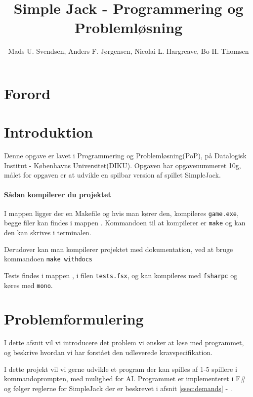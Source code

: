 \documentclass[a4paper]{article}
\title{Simple Jack - Programmering og Problemløsning}
\author{Mads U. Svendsen, Anders F. Jørgensen, Nicolai L. Hargreave, Bo H. Thomsen}
\begin{document}
	\maketitle %
        
  \tableofcontents

  \newpage

\section{Forord}
    
\section{Introduktion} \label{sec:introduction}
    Denne opgave er lavet i Programmering og Problemløsning(PoP),
    på Datalogisk Institut - Københavns Universitet(DIKU).
    Opgaven har opgavenummeret 10g, målet for opgaven er at
    udvikle en spilbar version af spillet SimpleJack.

    \paragraph*{Sådan kompilerer du projektet\\}
    I  mappen ligger der en Makefile og hvis man kører den, 
    kompileres \lstinline$game.exe$,
    begge filer kan findes i mappen .
    Kommandoen til at kompilerer er  \lstinline$make$ og kan den kan skrives i terminalen.

    Derudover kan man kompilerer projektet med dokumentation, ved at bruge kommandoen \lstinline$make withdocs$

    Tests findes i  mappen , i filen \lstinline$tests.fsx$,
    og kan kompileres med \lstinline$fsharpc$ og køres med \lstinline$mono$.

\newpage

\section{Problemformulering} \label{sec:problem}
  I dette afsnit vil vi introducere det problem vi ønsker at løse med programmet,
  og beskrive hvordan vi har forstået den udleverede kravspecifikation.

  I dette projekt vil vi gerne udvikle et program der kan spilles af 1-5 spillere i kommandoprompten,
  med mulighed for AI. Programmet er implementeret i F\# og følger reglerne for SimpleJack der er beskrevet i afsnit \ref{ssec:demands} - .
\end{document}
